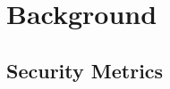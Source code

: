 
\chapter{Background} \label{ch:background}







% 








% 

\section{Security Metrics}\label{sec:background:metrics}



